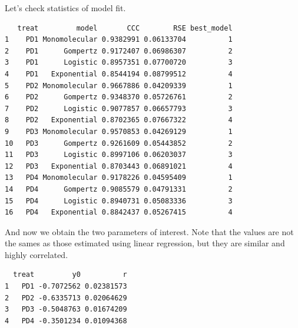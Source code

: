 \documentclass[
  letterpaper,
  DIV=11,
  numbers=noendperiod]{scrreprt}
\newenvironment{Shaded}{\begin{snugshade}}{\end{snugshade}}
\newcommand{\FunctionTok}[1]{\textcolor[rgb]{0.28,0.35,0.67}{#1}}
\newcommand{\NormalTok}[1]{\textcolor[rgb]{0.00,0.23,0.31}{#1}}
\newcommand{\SpecialCharTok}[1]{\textcolor[rgb]{0.37,0.37,0.37}{#1}}
\newcommand{\StringTok}[1]{\textcolor[rgb]{0.13,0.47,0.30}{#1}}
\begin{document}
Let's check statistics of model fit.

\begin{Shaded}
\end{Shaded}

\begin{verbatim}
   treat         model       CCC        RSE best_model
1    PD1 Monomolecular 0.9382991 0.06133704          1
2    PD1      Gompertz 0.9172407 0.06986307          2
3    PD1      Logistic 0.8957351 0.07700720          3
4    PD1   Exponential 0.8544194 0.08799512          4
5    PD2 Monomolecular 0.9667886 0.04209339          1
6    PD2      Gompertz 0.9348370 0.05726761          2
7    PD2      Logistic 0.9077857 0.06657793          3
8    PD2   Exponential 0.8702365 0.07667322          4
9    PD3 Monomolecular 0.9570853 0.04269129          1
10   PD3      Gompertz 0.9261609 0.05443852          2
11   PD3      Logistic 0.8997106 0.06203037          3
12   PD3   Exponential 0.8703443 0.06891021          4
13   PD4 Monomolecular 0.9178226 0.04595409          1
14   PD4      Gompertz 0.9085579 0.04791331          2
15   PD4      Logistic 0.8940731 0.05083336          3
16   PD4   Exponential 0.8842437 0.05267415          4
\end{verbatim}

And now we obtain the two parameters of interest. Note that the values
are not the sames as those estimated using linear regression, but they
are similar and highly correlated.

\begin{Shaded}
\end{Shaded}

\begin{verbatim}
  treat         y0          r
1   PD1 -0.7072562 0.02381573
2   PD2 -0.6335713 0.02064629
3   PD3 -0.5048763 0.01674209
4   PD4 -0.3501234 0.01094368
\end{verbatim}
\end{document}
